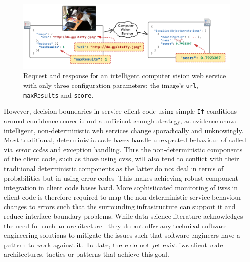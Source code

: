 \begin{figure}[th]
    \includegraphics[width=\linewidth]{dog-example}
    \caption[Sample request and response for intelligent services]{Request and response for an intelligent computer vision web service with only three configuration parameters: the image's \texttt{url}, \texttt{maxResults} and \texttt{score}.}
    \label{fig:dog-example}
\end{figure}


However, decision boundaries in service client code using simple \texttt{If} conditions around confidence scores is not a sufficient enough strategy, as evidence shows intelligent, non-deterministic web services change sporadically and unknowingly. Most traditional, deterministic code bases handle unexpected behaviour of called  via \textit{error codes} and exception handling. Thus the non-deterministic components of the client code, such as those using \glspl{cvs}, will also tend to conflict with their traditional deterministic components as the latter do not deal in terms of probabilities but in using error codes. 
This makes achieving robust component integration in client code bases hard.
More sophisticated monitoring of \glspl{iws} in client code is therefore required to map the non-deterministic service behaviour changes to errors such that the surrounding infrastructure can support it and reduce interface boundary problems. While data science literature acknowledges the need for such an architecture~\citep{10.1007/978-3-319-08976-8_16} they do not offer any technical software engineering solutions to mitigate the issues such that software engineers have a pattern to work against it. To date, there do not yet exist \gls{iws} client code architectures, tactics or patterns that achieve this goal.

